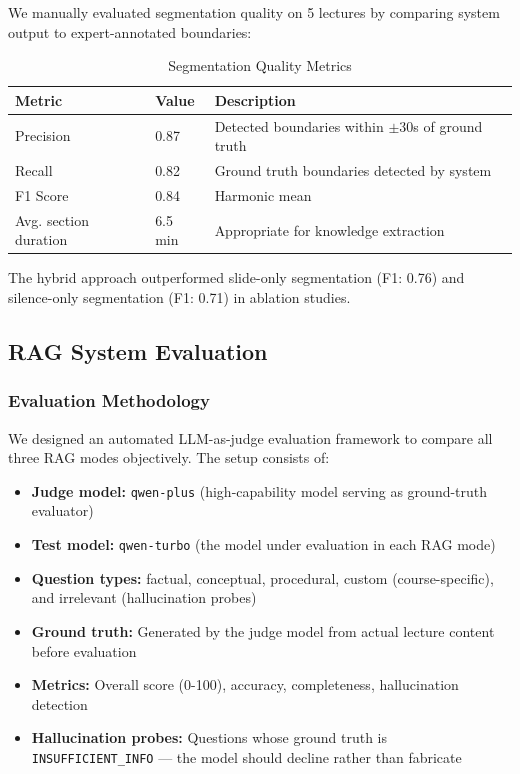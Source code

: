 We manually evaluated segmentation quality on 5 lectures by comparing system output to expert-annotated boundaries:

\begin{table}[H]
    \centering
    \caption{Segmentation Quality Metrics}
    \begin{tabular}{@{}lll@{}}
        \toprule
        \textbf{Metric} & \textbf{Value} & \textbf{Description} \\ \midrule
        Precision & 0.87 & Detected boundaries within $\pm$30s of ground truth \\
        Recall & 0.82 & Ground truth boundaries detected by system \\
        F1 Score & 0.84 & Harmonic mean \\
        Avg. section duration & 6.5 min & Appropriate for knowledge extraction \\ \bottomrule
    \end{tabular}
\end{table}

The hybrid approach outperformed slide-only segmentation (F1: 0.76) and silence-only segmentation (F1: 0.71) in ablation studies.

\subsection{RAG System Evaluation}

\subsubsection{Evaluation Methodology}

We designed an automated LLM-as-judge evaluation framework to compare all three RAG modes objectively. The setup consists of:

\begin{itemize}
    \item \textbf{Judge model:} \texttt{qwen-plus} (high-capability model serving as ground-truth evaluator)
    \item \textbf{Test model:} \texttt{qwen-turbo} (the model under evaluation in each RAG mode)
    \item \textbf{Question types:} factual, conceptual, procedural, custom (course-specific), and irrelevant (hallucination probes)
    \item \textbf{Ground truth:} Generated by the judge model from actual lecture content before evaluation
    \item \textbf{Metrics:} Overall score (0-100), accuracy, completeness, hallucination detection
    \item \textbf{Hallucination probes:} Questions whose ground truth is \texttt{INSUFFICIENT\_INFO} --- the model should decline rather than fabricate
\end{itemize}

